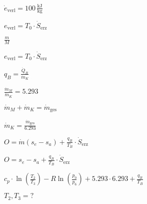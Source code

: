 \( \dot{e}_{\text{verl}} = 100 \, \frac{\text{kJ}}{\text{kg}} \)  

\( e_{\text{verl}} = T_0 \cdot \dot{S}_{\text{erz}} \)  

\( \frac{m}{M} \)  

\( e_{\text{verl}} = T_0 \cdot \dot{S}_{\text{erz}} \)  

\( q_B = \frac{\dot{Q}_B}{\dot{m}_K} \)  

\( \frac{\dot{m}_M}{\dot{m}_K} = 5.293 \)  

\( \dot{m}_M + \dot{m}_K = \dot{m}_{\text{ges}} \)  

\( \dot{m}_K = \frac{\dot{m}_{\text{ges}}}{6.293} \)  

\( O = \dot{m} (s_e - s_a) + \frac{q_B}{T_B} \cdot \dot{S}_{\text{erz}} \)  

\( O = s_e - s_a + \frac{q_B}{T_B} \cdot \dot{S}_{\text{erz}} \)  

\( c_p \cdot \ln \left( \frac{T_2}{T_3} \right) - R \ln \left( \frac{p_0}{p_6} \right) + 5.293 \cdot 6.293 + \frac{q_B}{T_B} \)  

\( T_2, T_3 = ? \)